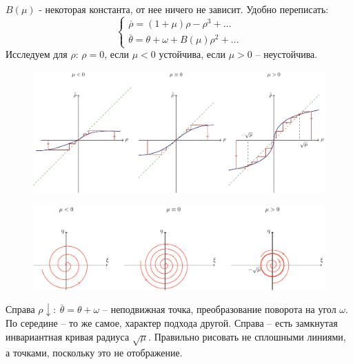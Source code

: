 $B(\mu)$ - некоторая константа, от нее ничего не зависит. Удобно переписать:
\begin{equation}
	\begin{cases}
		\stackrel{\_}{\rho}= (1+\mu)\rho-\rho^3+\dots \\
		\stackrel{\_}{\theta}= \theta+\omega+B(\mu)\rho^2+\dots
	\end{cases}
	\label{eq:s9:5}	
\end{equation}
Исследуем для $\rho$: $\rho=0$, если $\mu<0$ устойчива, если $\mu>0$ -- неустойчива.
\begin{figure}[H]
	\centering
	\includegraphics[width=1\linewidth]{fig/fig73.pdf}   
\end{figure}
\begin{figure}[H]
	\centering
	\includegraphics[width=1\linewidth]{fig/fig72.pdf}   
\end{figure}
Справа $\rho \downarrow: ~\stackrel{\_}{\theta}= \theta+\omega$ -- неподвижная точка, преобразование поворота на угол $\omega$. По середине -- то же самое, характер подхода другой. Справа -- есть замкнутая инвариантная кривая радиуса $\sqrt{\mu}$.
Правильно рисовать не сплошными линиями, а точками, поскольку это не отображение.

